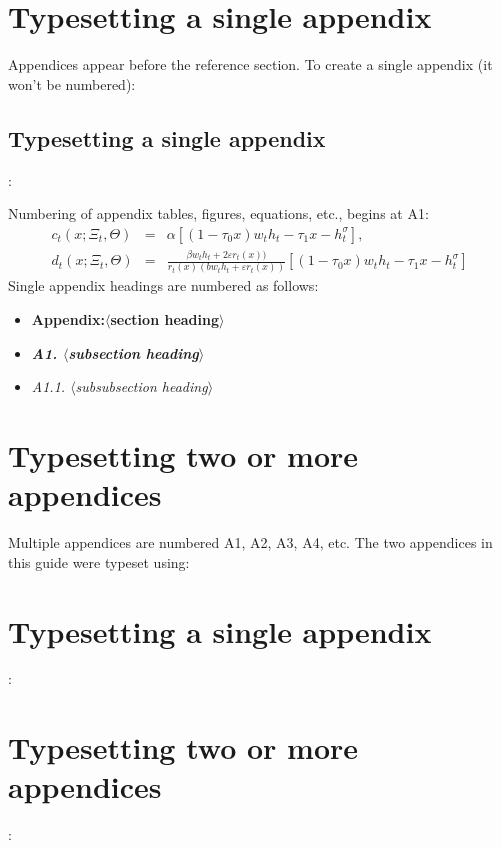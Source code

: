 \documentclass{cje}          %
\theoremstyle{plain}%
\theoremstyle{definition}
\theoremstyle{remark}
\begin{document}
\appendix

\section{Typesetting a single appendix}
\label{single}

Appendices appear before the reference section. To create a single appendix (it won't be numbered):
\begin{smallverbatim}
\oneappendix
\section{Typesetting a single appendix}
  :
\end{smallverbatim}
Numbering of appendix tables, figures, equations, etc., begins at A1:
\begin{eqnarray}
\label{appeqnone}
 c_t(x;\Xi_t,\Theta) &=& \alpha[(1-\tau_0x)w_th_t - \tau_1x - h_t^\sigma],\nonumber\\[3pt]
 d_t(x;\Xi_t,\Theta) &=& \frac{\beta w_t h_t + 2\varepsilon r_t(x))}{r_t(x)(bw_t h_t + \varepsilon r_t(x))} 
 \left[(1-\tau_0 x)w_t h_t - \tau_1 x -h_t^\sigma\right]
\end{eqnarray}
Single appendix headings are numbered as follows:
\begin{itemize}
  \item \textbf{Appendix:\enskip $\langle$section heading$\rangle$}
  \item {\bfseries\textit{A1. $\langle$subsection heading$\rangle$}} 
  \item \textit{A1.1. $\langle$subsubsection heading$\rangle$}
\end{itemize}

\section{Typesetting two or more appendices}
\label{multiple}

Multiple appendices are numbered A1, A2, A3, A4, etc.
The two appendices in this guide were typeset using:
\begin{smallverbatim}
\appendix
\section{Typesetting a single appendix}
 :
\section{Typesetting two or more appendices}
 :
\end{smallverbatim}
\end{document}
